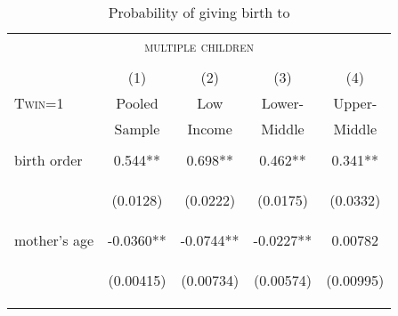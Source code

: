 \documentclass{article}[11pt,subeqn]
\begin{document}
\begin{spacing}{1.5}
\begin{table}[ht]
\caption{Probability of giving birth to}
\vspace{-7mm}
\label{tab:twinreg1}
\begin{center}
\begin{tabular}{lcccc} 
\multicolumn{5}{c}{\textsc{multiple children}}\\
& & \\
\toprule
 & (1) & (2) & (3) & (4) \\
\textsc{Twin=1} & Pooled & Low & Lower- & Upper- \\ 
 & Sample & Income & Middle & Middle \\  \midrule
\vspace{4pt} & \begin{footnotesize}\end{footnotesize} & \begin{footnotesize}\end{footnotesize} & \begin{footnotesize}\end{footnotesize} & \begin{footnotesize}\end{footnotesize} \\
birth order & 0.544** & 0.698** & 0.462** & 0.341** \\
\vspace{4pt} & \begin{footnotesize}(0.0128)\end{footnotesize} & \begin{footnotesize}(0.0222)\end{footnotesize} & \begin{footnotesize}(0.0175)\end{footnotesize} & \begin{footnotesize}(0.0332)\end{footnotesize} \\
mother's age & -0.0360** & -0.0744** & -0.0227** & 0.00782 \\
\vspace{4pt} & \begin{footnotesize}(0.00415)\end{footnotesize} & \begin{footnotesize}(0.00734)\end{footnotesize} & \begin{footnotesize}(0.00574)\end{footnotesize} & \begin{footnotesize}(0.00995)\end{footnotesize} \\

\end{tabular}
\end{center}
\end{table}
\end{spacing}
\end{document}
